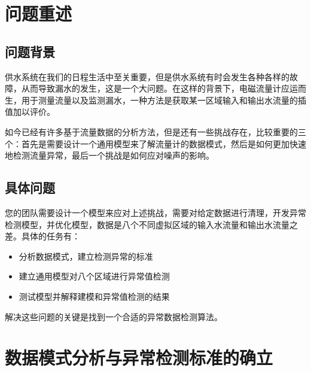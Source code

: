 \documentclass[UTF8]{article}
\begin{document}
	\section{问题重述}
		\subsection{问题背景}
		\par 供水系统在我们的日程生活中至关重要，但是供水系统有时会发生各种各样的故障，从而导致漏水的发生，这是一个大问题。在这样的背景下，电磁流量计应运而生，用于测量流量以及监测漏水，一种方法是获取某一区域输入和输出水流量的插值加以评价。 
		\par 如今已经有许多基于流量数据的分析方法，但是还有一些挑战存在，比较重要的三个：首先是需要设计一个通用模型来了解流量计的数据模式，然后是如何更加快速地检测流量异常，最后一个挑战是如何应对噪声的影响。\cite[C1]{znswxxh}
		\subsection{具体问题}
		\par 您的团队需要设计一个模型来应对上述挑战，需要对给定数据进行清理，开发异常检测模型，并优化模型，数据是八个不同虚拟区域的输入水流量和输出水流量之差。具体的任务有：

		\begin{itemize}
			\item 分析数据模式，建立检测异常的标准
			\item 建立通用模型对八个区域进行异常值检测
			\item 测试模型并解释建模和异常值检测的结果
		\end{itemize}
		解决这些问题的关键是找到一个合适的异常数据检测算法。
	\section{数据模式分析与异常检测标准的确立}	
\end{document}
